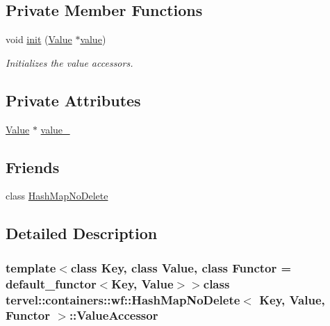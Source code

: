 \subsection*{Private Member Functions}
\begin{DoxyCompactItemize}
\item 
void \hyperlink{classtervel_1_1containers_1_1wf_1_1_hash_map_no_delete_1_1_value_accessor_aacf538df718d0e496336ff3a11290c9b}{init} (\hyperlink{hash__map_2test_object_8h_ad777bf08d8e2b01df17ba5e3c51ae11f}{Value} $\ast$\hyperlink{classtervel_1_1containers_1_1wf_1_1_hash_map_no_delete_1_1_value_accessor_acf5a7975064652eacc15c034fe6391b6}{value})
\begin{DoxyCompactList}\small\item\em Initializes the value accessors. \end{DoxyCompactList}\end{DoxyCompactItemize}
\subsection*{Private Attributes}
\begin{DoxyCompactItemize}
\item 
\hyperlink{hash__map_2test_object_8h_ad777bf08d8e2b01df17ba5e3c51ae11f}{Value} $\ast$ \hyperlink{classtervel_1_1containers_1_1wf_1_1_hash_map_no_delete_1_1_value_accessor_a5e4972255abbbd6ae7ff8d7f15d6ff67}{value\+\_\+}
\end{DoxyCompactItemize}
\subsection*{Friends}
\begin{DoxyCompactItemize}
\item 
class \hyperlink{classtervel_1_1containers_1_1wf_1_1_hash_map_no_delete_1_1_value_accessor_a8a4142949547f715390cedfd99659a85}{Hash\+Map\+No\+Delete}
\end{DoxyCompactItemize}


\subsection{Detailed Description}
\subsubsection*{template$<$class Key, class Value, class Functor = default\+\_\+functor$<$\+Key, Value$>$$>$class tervel\+::containers\+::wf\+::\+Hash\+Map\+No\+Delete$<$ Key, Value, Functor $>$\+::\+Value\+Accessor}

